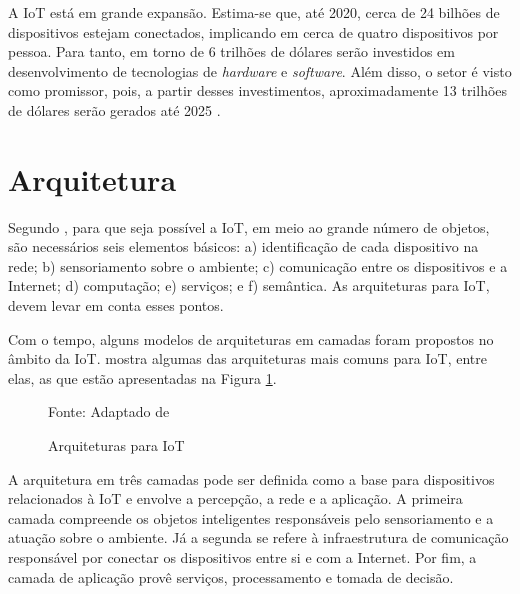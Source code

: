 A IoT está em grande expansão. Estima-se que, até 2020, cerca de 24 bilhões de dispositivos estejam conectados, implicando em cerca de quatro dispositivos por pessoa. Para tanto, em torno de 6 trilhões de dólares serão investidos em desenvolvimento de tecnologias de \textit{hardware} e \textit{software}. Além disso, o setor é visto como promissor, pois, a partir desses investimentos, aproximadamente 13 trilhões de dólares serão gerados até 2025 \cite{Meola2016}.

\section{Arquitetura}

Segundo , para que seja possível a IoT, em meio ao grande número de objetos, são necessários seis elementos básicos: a) identificação de cada dispositivo na rede; b) sensoriamento sobre o ambiente; c) comunicação entre os dispositivos e a Internet; d) computação; e) serviços; e f) semântica. As arquiteturas para IoT, devem levar em conta esses pontos.

Com o tempo, alguns modelos de arquiteturas em camadas foram propostos no âmbito da IoT.  mostra algumas das arquiteturas mais comuns para IoT, entre elas, as que estão apresentadas na Figura \ref{fig:cap2_arquiteturas}.

\begin{figure}[htb]
	\caption{Arquiteturas para IoT}

	\footnotesize{Fonte: Adaptado de }
	\label{fig:cap2_arquiteturas}
\end{figure}

A arquitetura em três camadas pode ser definida como a base para dispositivos relacionados à IoT e envolve a  percepção, a rede e a aplicação. A primeira camada compreende os objetos inteligentes responsáveis pelo sensoriamento e a atuação sobre o ambiente. Já a segunda se refere à infraestrutura de comunicação responsável por conectar os dispositivos entre si e com a Internet. Por fim, a camada de aplicação provê serviços, processamento e tomada de decisão.  

